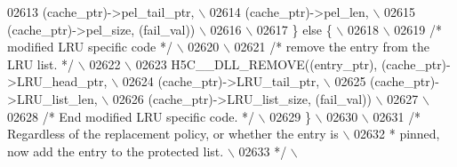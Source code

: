 \begin{DoxyCode}
02613 \textcolor{preprocessor}{                        (cache\_ptr)->pel\_tail\_ptr,            \(\backslash\)}
02614 \textcolor{preprocessor}{            (cache\_ptr)->pel\_len,                             \(\backslash\)}
02615 \textcolor{preprocessor}{                        (cache\_ptr)->pel\_size, (fail\_val))                \(\backslash\)}
02616 \textcolor{preprocessor}{                                                                          \(\backslash\)}
02617 \textcolor{preprocessor}{    \} else \{                                                              \(\backslash\)}
02618 \textcolor{preprocessor}{                                                                          \(\backslash\)}
02619 \textcolor{preprocessor}{        }\textcolor{comment}{/* modified LRU specific code */}\textcolor{preprocessor}{                                  \(\backslash\)}
02620 \textcolor{preprocessor}{                                                                          \(\backslash\)}
02621 \textcolor{preprocessor}{        }\textcolor{comment}{/* remove the entry from the LRU list. */}\textcolor{preprocessor}{                         \(\backslash\)}
02622 \textcolor{preprocessor}{                                                                          \(\backslash\)}
02623 \textcolor{preprocessor}{        H5C\_\_DLL\_REMOVE((entry\_ptr), (cache\_ptr)->LRU\_head\_ptr,           \(\backslash\)}
02624 \textcolor{preprocessor}{                        (cache\_ptr)->LRU\_tail\_ptr,                        \(\backslash\)}
02625 \textcolor{preprocessor}{            (cache\_ptr)->LRU\_list\_len,                        \(\backslash\)}
02626 \textcolor{preprocessor}{                        (cache\_ptr)->LRU\_list\_size, (fail\_val))           \(\backslash\)}
02627 \textcolor{preprocessor}{                                                                          \(\backslash\)}
02628 \textcolor{preprocessor}{        }\textcolor{comment}{/* End modified LRU specific code. */}\textcolor{preprocessor}{                             \(\backslash\)}
02629 \textcolor{preprocessor}{    \}                                                                     \(\backslash\)}
02630 \textcolor{preprocessor}{                                                                          \(\backslash\)}
02631 \textcolor{preprocessor}{    }\textcolor{comment}{/* Regardless of the replacement policy, or whether the entry is      \(\backslash\)}
02632 \textcolor{comment}{     * pinned, now add the entry to the protected list.                   \(\backslash\)}
02633 \textcolor{comment}{     */}\textcolor{preprocessor}{                                                                   \(\backslash\)}

\end{DoxyCode}

